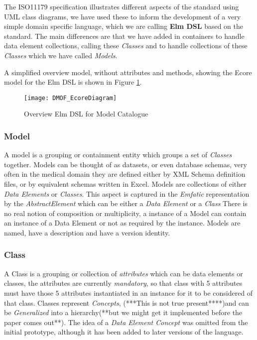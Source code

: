 The ISO11179 specification illustrates different aspects of the standard using UML class diagrams, we have used these to inform the development of a very simple domain specific language, which we are calling \textbf{Elm DSL} based on the standard. The main differences are that we have added in containers to handle data element collections, calling these \emph{Classes} and to handle collections of these \emph{Classes} which we have called \emph{Models}.

A simplified overview model, without attributes and methods, showing the Ecore model for the Elm DSL is shown in Figure \ref{fig:mcSimplifiedOverview}.

\begin{figure}[here]
	\texttt{[image: DMOF\_EcoreDiagram]}
	\caption{Overview Elm DSL for Model Catalogue} 
	\label{fig:mcSimplifiedOverview}
\end{figure}

\subsubsection{Model}
A model is a grouping or containment entity which groups a set of \emph{Classes} together. Models can be thought of as datasets, or even database schemas, very often in the medical domain they are defined either by XML Schema definition files, or by equivalent schemas written in Excel. 
Models are collections of either \emph{Data Elements} or \emph{Classes}. This aspect is captured in the \emph{Emfatic} representation by the \emph{AbstractElement} which can be either a  \emph{Data Element} or a \emph{Class}  There is no real notion of composition or multiplicity, a instance of a Model can contain an instance of a Data Element or not as required by the instance.  Models are named, have a description and have a version identity.
\subsubsection{Class}
A Class is a grouping or collection of \emph{attributes} which can be data elements or classes, the attributes are currently \emph{mandatory}, so that class with 5 attributes must have those 5 attributes instantiated in an instance for it to be considered of that class. Classes represent \emph{Concepts}, (***This is not true present****)and can be \emph{Generalized} into a hierarchy(**but we might get it implemented before the paper comes out**). The idea of a \emph{Data Element Concept} was omitted from the initial prototype, although it has been added to later versions of the language.
